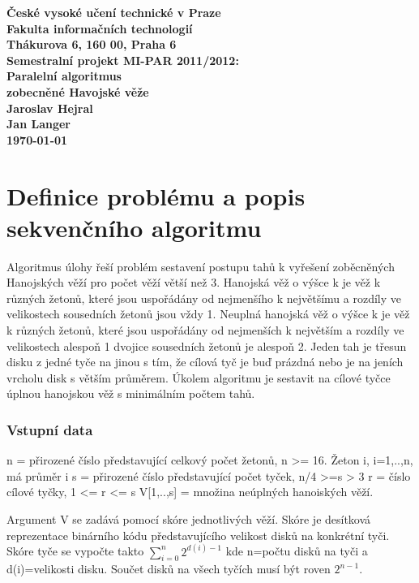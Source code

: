 \documentclass[12pt]{article}
\begin{document}

\begin{center}
\bf České vysoké učení technické v Praze\\[2mm]
	Fakulta informačních technologií\\[2mm]
	Thákurova 6, 160 00, Praha 6\\[15mm]
	Semestralní projekt MI-PAR 2011/2012:\\
    Paralelní algoritmus \\
    zobecněné Havojské věže\\[5mm]
       Jaroslav Hejral\\
       Jan Langer\\[2mm]
\today
\end{center}

\section{Definice problému a popis sekvenčního algoritmu}
Algoritmus úlohy řeší problém sestavení postupu tahů k vyřešení zoběcněných Hanojských věží pro počet věží větší než 3. Hanojská věž o výšce k je věž k různých žetonů, které jsou uspořádány od nejmenšího k největšímu a rozdíly ve velikostech sousedních žetonů jsou vždy 1. Neuplná hanojská věž o výšce k je věž k různých žetonů, které jsou uspořádány od nejmenších k největším a rozdíly ve velikostech alespoň 1 dvojice sousedních žetonů je alespoň 2. Jeden tah je třesun disku z jedné tyče na jinou s tím, že cílová tyč je buď prázdná nebo je na jeních vrcholu disk s větším průměrem. Úkolem algoritmu je sestavit na cílové tyčce úplnou hanojskou věž s minimálním počtem tahů.

\subsubsection{Vstupní data}

n = přirozené číslo představující celkový počet žetonů, n >= 16. Žeton i, i=1,..,n, má průměr i
s = přirozené číslo představující počet tyček, n/4 >=s > 3
r = číslo cílové tyčky, 1 <= r <= s
V[1,..,s] = množina neúplných hanoiských věží.

Argument V se zadává pomocí skóre jednotlivých věží. Skóre je desítková reprezentace binárního kódu představujícího velikost disků na konkrétní tyči. Skóre tyče se vypočte takto $\displaystyle\sum\limits_{i=0}^n {2^{d(i)-1}}$ kde n=počtu disků na tyči a d(i)=velikosti disku. Součet disků na všech tyčích musí být roven $2^{n-1}$.
\end{document}
